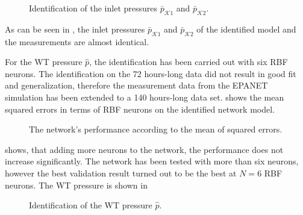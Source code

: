  \begin{figure}[H]
 \centering
  
 \vspace{-2.5mm}
 \caption{Identification of the inlet pressures $\bar{p}_{\mathcal{K}1}$ and $\bar{p}_{\mathcal{K}2}$.}
 \label{fig:pk1_sigma1}
 \end{figure}

 \vspace{-4mm}

 As can be seen in , the inlet pressures $\bar{p}_{\mathcal{K}1}$ and $\bar{p}_{\mathcal{K}2}$ of the identified model and the measurements are almost identical. 

For the WT pressure $\hat{p}$, the identification has been carried out with six RBF neurons. The identification on the 72 hours-long data did not result in good fit and generalization, therefore the measurement data from the EPANET simulation has been extended to a 140 hours-long data set.  shows the mean squared errors in terms of RBF neurons on the identified network model.

\vspace{-1mm}

 \begin{figure}[H]
 \centering
  
 \vspace{-3.5mm}
 \caption{The network’s performance according to the mean of squared errors.}
 \label{fig:MSE_state}
 \end{figure}

 \vspace{-3mm}

  shows, that adding more neurons to the network, the performance does not increase significantly. The network has been tested with more than six neurons, however the best validation result turned out to be the best at $N = 6$ RBF neurons. The WT pressure is shown in 



 \begin{figure}[H]
 \centering
  
 \vspace{-2.5mm}
 \caption{Identification of the WT pressure $\hat{p}$.}
 \label{fig:WT_ident_sigma1}
 \end{figure}

